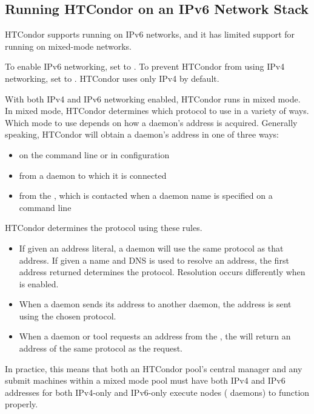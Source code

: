 \subsection{\label{sec:ipv6}Running HTCondor on an IPv6 Network Stack}

HTCondor supports running on IPv6 networks, and it has limited support for
running on mixed-mode networks.

To enable IPv6 networking, set  to .  To
prevent HTCondor from using IPv4 networking, set  to
.  HTCondor uses only IPv4 by default.

With both IPv4 and IPv6 networking enabled, 
HTCondor runs in mixed mode.  
In mixed mode, HTCondor determines which protocol to use in a
variety of ways. 
Which mode to use depends on how a daemon's address is acquired.
Generally speaking, HTCondor will obtain a daemon's
address in one of three ways:

\begin{itemize}
\item{on the command line or in configuration}
\item{from a daemon to which it is connected}
\item{from the , which is contacted when a daemon
name is specified on a command line}
\end{itemize}

HTCondor determines the protocol using these rules.

\begin{itemize}
\item{If given an address literal, a daemon will use the same protocol as
that address.
If given a name and DNS is used to resolve an address, 
the first address returned determines the protocol.
Resolution occurs differently when  is enabled.  }
\item{When a daemon sends its address to another daemon, the address
is sent using the chosen protocol. }
\item{When a daemon or tool requests an address from the ,
the  will return an address of the same protocol
as the request.  }
\end{itemize}

In practice, this means that both an HTCondor pool's central manager
and any submit machines within a mixed mode pool must have both IPv4 and IPv6
addresses for both IPv4-only and IPv6-only execute nodes 
( daemons) to function properly.

